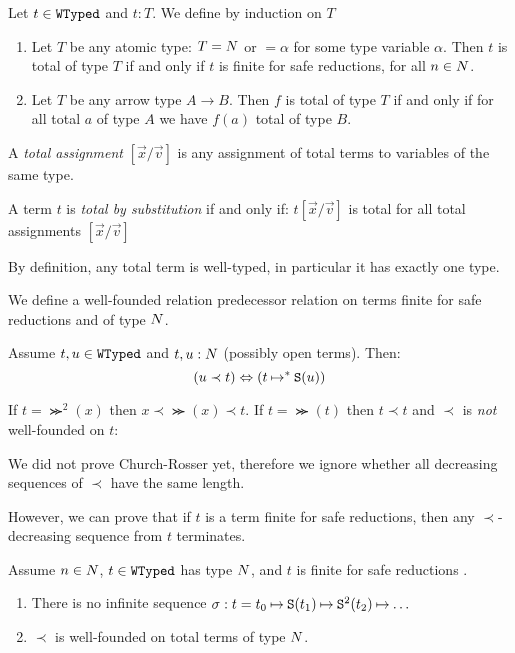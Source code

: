 \begin{definition}
\label{definition-total-term}
Let $t \in {\tt WTyped}$ and $t : T$.
We define  by induction on $T$

\begin{enumerate}
\item
Let $T$ be any atomic type: $T = {N}$ or $=\alpha$ for some type variable $\alpha$.
Then $t$ is total of type $T$ if and only if $t$ is finite for safe reductions, for all $n \in {N}$.

\item
Let $T$ be any arrow type $A \rightarrow B$.
Then $f$ is total of type $T$ if and only if for all total $a$ of type $A$ we have $f(a)$ total of type $B$.
\end{enumerate}

A \emph{total assignment} $[\vec{x}/\vec{v}]$ 
is any assignment of total terms to variables of the same type.

A term $t$ is \emph{total by substitution} if and only if:
$t[\vec{x}/\vec{v}]$ is total for all total assignments $[\vec{x}/\vec{v}]$
\end{definition}

By definition, any total term is well-typed, in particular it has exactly one type. 

We define a well-founded relation predecessor relation on terms finite for safe reductions and of type ${N}$.

\begin{definition}
Assume $t, u \in {\tt WTyped}$ and $t, u :{N}$ (possibly open terms).
Then:
$$
(u \prec t) \Leftrightarrow (t \mathbin{\mapsto}^* {\tt S}(u))
$$
\end{definition}


\begin{Eg}
If $t = \Succ^2(x)$ then $x \prec \Succ(x) \prec t$. 
If $t = \Succ(t)$ then $t \prec t$ and $\prec$ is \emph{not} well-founded on $t$:
\end{Eg}

We did not prove Church-Rosser yet, 
therefore we ignore whether all decreasing sequences of $\prec$ have the same length. 

However, we can prove that if $t$ is a term finite for safe reductions, 
then any $\prec$-decreasing sequence from $t$ terminates.


\begin{lemma}
\label{lemma-prec-order}
Assume $n \in {N}$, $t \in {\tt WTyped}$ has type ${N}$, and $t$ is finite for safe reductions .

\begin{enumerate}
\item
\label{lemma-prec-order-01}
There is no infinite sequence 
$\sigma: t = t_0 \mathbin{\mapsto} {\tt S}(t_1) \mathbin{\mapsto} {\tt S}^2(t_2) \mathbin{\mapsto} \ldots$

\item
\label{lemma-prec-order-02}
$\prec$ is well-founded on total terms of type ${N}$.
\end{enumerate}
\end{lemma}


